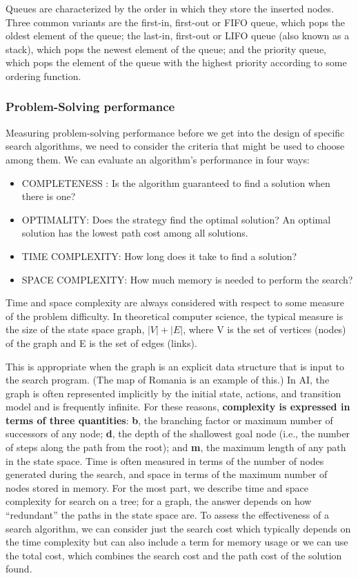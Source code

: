 Queues are characterized by the order in which they store the inserted nodes. Three common variants are the first-in, first-out or FIFO queue, which pops the oldest element of the queue;
the last-in, first-out or LIFO queue (also known as a stack), which pops the newest element of the queue; and the priority queue, which pops the element of the queue with the highest
priority according to some ordering function.

\subsubsection{Problem-Solving performance}
Measuring problem-solving performance before we get into the design of specific search algorithms, we need to consider the criteria that might be used to choose among them.
We can evaluate an algorithm’s performance in four ways:
\begin{itemize}
  \item COMPLETENESS : Is the algorithm guaranteed to find a solution when there is one?
  \item OPTIMALITY: Does the strategy find the optimal solution? An optimal solution has the lowest path cost among all solutions.
  \item TIME COMPLEXITY: How long does it take to find a solution?
  \item SPACE COMPLEXITY: How much memory is needed to perform the search?
\end{itemize}

Time and space complexity are always considered with respect to some measure of the problem difficulty. In theoretical computer science, the typical measure is the size of the state space graph, $|V| + |E|$, where V is the set of vertices (nodes) of the graph and E is the set of edges (links).

This is appropriate when the graph is an explicit data structure that is input to the search program. (The map of Romania is an example of this.)
In AI, the graph is often represented implicitly by the initial state, actions, and transition model and is frequently infinite.
For these reasons, \textcolor{CadetBlue!90}{\textbf{complexity is expressed in terms of three quantities}}: \textbf{b}, the branching factor or maximum number of successors of any node; \textbf{d}, the depth of the shallowest goal node (i.e., the number of steps along the path from the root); and \textbf{m}, the maximum length of any path in the state space. Time is often measured in terms of the number of nodes generated during the search, and space in terms of the maximum number of nodes stored in memory.
For the most part, we describe time and space complexity for search on a tree; for a graph, the answer depends on how “redundant” the paths in the state space are.
To assess the effectiveness of a search algorithm, we can consider just the search cost which typically depends on the time complexity but can also include a term for memory usage or we can use the total cost, which combines the search cost and the path cost of the solution found.

